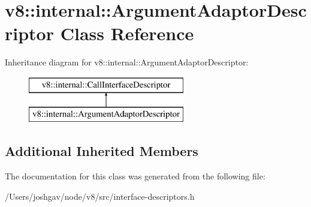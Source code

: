 \hypertarget{classv8_1_1internal_1_1_argument_adaptor_descriptor}{}\section{v8\+:\+:internal\+:\+:Argument\+Adaptor\+Descriptor Class Reference}
\label{classv8_1_1internal_1_1_argument_adaptor_descriptor}
Inheritance diagram for v8\+:\+:internal\+:\+:Argument\+Adaptor\+Descriptor\+:\begin{figure}[H]
\begin{center}
\leavevmode
\includegraphics[height=2.000000cm]{classv8_1_1internal_1_1_argument_adaptor_descriptor}
\end{center}
\end{figure}
\subsection*{Additional Inherited Members}


The documentation for this class was generated from the following file\+:\begin{DoxyCompactItemize}
\item 
/\+Users/joshgav/node/v8/src/interface-\/descriptors.\+h\end{DoxyCompactItemize}
